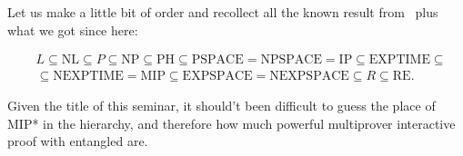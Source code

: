 Let us make a little bit of order and recollect all the known result from~\cite{papadimitriou1994computational} plus what we got since here:

\begin{equation}
\begin{split}
    &L \subseteq \text{NL} \subseteq P \subseteq \text{NP} \subseteq \text{PH} \subseteq \text{PSPACE} = \text{NPSPACE} = \text{IP} \subseteq \text{EXPTIME} \subseteq  \\
    &\subseteq \text{NEXPTIME} = \text{MIP} \subseteq \text{EXPSPACE} = \text{NEXPSPACE} \subseteq R \subseteq \text{RE}.
\end{split}
\end{equation}

Given the title of this seminar, it should't been difficult to guess the place of MIP* in the hierarchy, and therefore how much powerful multiprover interactive proof with entangled are.

